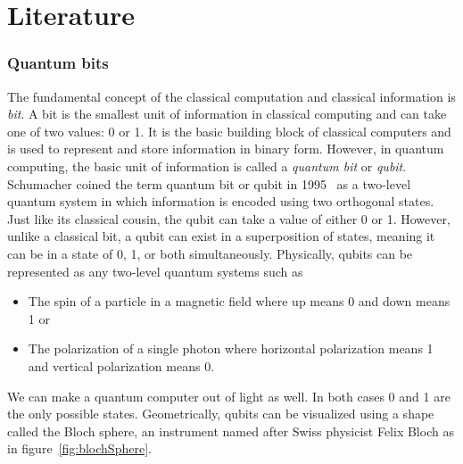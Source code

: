 \chapter{Literature}
\label{section:literature}

\subsection{Quantum bits}

The fundamental concept of the classical computation and classical information is \textit{bit}. A bit is the smallest unit of information in classical computing and can take one of two values: 0 or 1. It is the basic building block of classical computers and is used to represent and store information in binary form. However, in quantum computing, the basic unit of information is called a \textit{quantum bit} or \textit{qubit}. %
Schumacher coined the term quantum bit or qubit in 1995~\cite{schumacher1995QuantumCoding} as a two-level quantum system in which information is encoded using two orthogonal states. Just like its classical cousin, the qubit can take a value of either 0 or 1. However, unlike a classical bit, a qubit can exist in a superposition of states, meaning it can be in a state of 0, 1, or both simultaneously. 
Physically, qubits can be represented as any two-level quantum systems such as
\begin{itemize}
  \item The spin of a particle in a magnetic field where up means 0 and down means 1 or
  \item The polarization of a single photon where horizontal polarization means 1 and vertical polarization means 0.
\end{itemize}

We can make a quantum computer out of light as well. In both cases 0 and 1 are the only possible states. Geometrically, qubits can be visualized using a shape called the Bloch sphere, an instrument named after Swiss physicist Felix Bloch as in figure~\ref{fig:blochSphere}.


